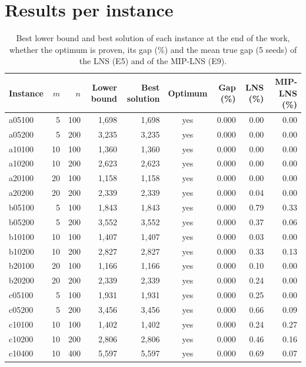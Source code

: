 \documentclass[11pt,a4paper]{article}
\begin{document}
\section{Results per instance}\label{sec:apendice}
\begin{table}[H]
\centering
\caption{Best lower bound and best solution of each instance at the end of the work, whether the
optimum is proven, its gap (\%) and the mean true gap (5 seeds) of the LNS (E5) and of the MIP-LNS
(E9).}
\label{tab:apendice}
\scriptsize
\begin{tabular}{l r r r r c r r r}
\toprule
Instance & $m$ & $n$ & Lower bound & Best solution & Optimum & Gap (\%) & LNS (\%) & MIP-LNS (\%) \\
\midrule
a05100 & 5 & 100 & 1,698 & 1,698 & yes & 0.000 & 0.00 & 0.00 \\
a05200 & 5 & 200 & 3,235 & 3,235 & yes & 0.000 & 0.00 & 0.00 \\
a10100 & 10 & 100 & 1,360 & 1,360 & yes & 0.000 & 0.00 & 0.00 \\
a10200 & 10 & 200 & 2,623 & 2,623 & yes & 0.000 & 0.00 & 0.00 \\
a20100 & 20 & 100 & 1,158 & 1,158 & yes & 0.000 & 0.00 & 0.00 \\
a20200 & 20 & 200 & 2,339 & 2,339 & yes & 0.000 & 0.04 & 0.00 \\
\midrule
b05100 & 5 & 100 & 1,843 & 1,843 & yes & 0.000 & 0.79 & 0.33 \\
b05200 & 5 & 200 & 3,552 & 3,552 & yes & 0.000 & 0.37 & 0.06 \\
b10100 & 10 & 100 & 1,407 & 1,407 & yes & 0.000 & 0.03 & 0.00 \\
b10200 & 10 & 200 & 2,827 & 2,827 & yes & 0.000 & 0.33 & 0.13 \\
b20100 & 20 & 100 & 1,166 & 1,166 & yes & 0.000 & 0.10 & 0.00 \\
b20200 & 20 & 200 & 2,339 & 2,339 & yes & 0.000 & 0.24 & 0.00 \\
\midrule
c05100 & 5 & 100 & 1,931 & 1,931 & yes & 0.000 & 0.25 & 0.00 \\
c05200 & 5 & 200 & 3,456 & 3,456 & yes & 0.000 & 0.66 & 0.09 \\
c10100 & 10 & 100 & 1,402 & 1,402 & yes & 0.000 & 0.24 & 0.27 \\
c10200 & 10 & 200 & 2,806 & 2,806 & yes & 0.000 & 0.46 & 0.16 \\
c10400 & 10 & 400 & 5,597 & 5,597 & yes & 0.000 & 0.69 & 0.07 \\

\end{tabular}
\end{table}
\end{document}
